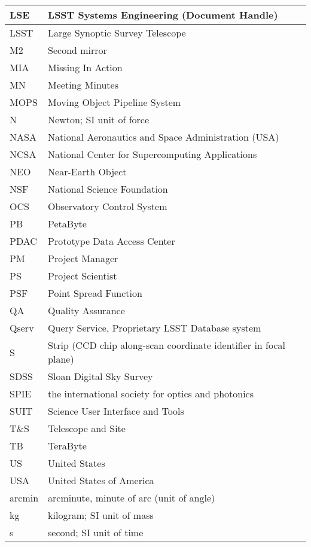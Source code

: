 \begin{longtable}{|l|p{}|}
LSE & LSST Systems Engineering (Document Handle) \\\hline
LSST & Large Synoptic Survey Telescope \\\hline
M2 & Second mirror \\\hline
MIA & Missing In Action \\\hline
MN & Meeting Minutes \\\hline
MOPS & Moving Object Pipeline System \\\hline
N & Newton; SI unit of force \\\hline
NASA & National Aeronautics and Space Administration (USA) \\\hline
NCSA & National Center for Supercomputing Applications \\\hline
NEO & Near-Earth Object \\\hline
NSF & National Science Foundation \\\hline
OCS & Observatory Control System \\\hline
PB & PetaByte \\\hline
PDAC & Prototype Data Access Center \\\hline
PM & Project Manager \\\hline
PS & Project Scientist \\\hline
PSF & Point Spread Function \\\hline
QA & Quality Assurance \\\hline
Qserv & Query Service, Proprietary LSST Database system \\\hline
S & Strip (CCD chip along-scan coordinate identifier in focal plane) \\\hline
SDSS & Sloan Digital Sky Survey \\\hline
SPIE & the international society for optics and photonics \\\hline
SUIT & Science User Interface and Tools \\\hline
T\&S & Telescope and Site \\\hline
TB & TeraByte \\\hline
US & United States \\\hline
USA & United States of America \\\hline
arcmin & arcminute, minute of arc (unit of angle) \\\hline
kg & kilogram; SI unit of mass \\\hline
s & second; SI unit of time \\\hline
\end{longtable}
